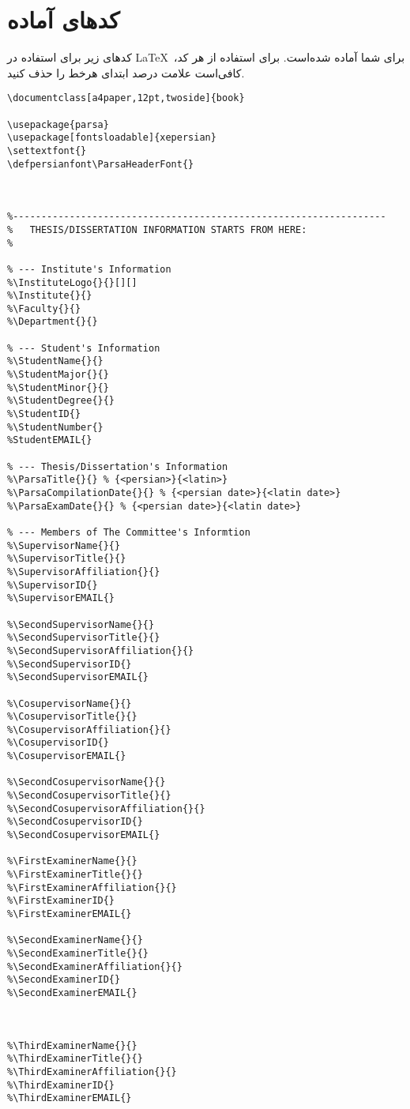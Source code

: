 \documentclass[12pt,a4paper,twoside,fleqn,notitlepage,openany]{extarticle}
\begin{document}
\section{کدهای آماده}
کدهای زیر برای استفاده در \LaTeX ~برای شما آماده شده‌است. برای استفاده از هر کد، کافی‌است علامت درصد ابتدای هرخط را حذف کنید.
\begin{latin}
\begin{verbatim}
\documentclass[a4paper,12pt,twoside]{book}

\usepackage{parsa}
\usepackage[fontsloadable]{xepersian}
\settextfont{} 
\defpersianfont\ParsaHeaderFont{} 



%------------------------------------------------------------------
%	THESIS/DISSERTATION INFORMATION STARTS FROM HERE:
%

% --- Institute's Information
%\InstituteLogo{}{}[][] 
%\Institute{}{}
%\Faculty{}{}
%\Department{}{} 

% --- Student's Information
%\StudentName{}{} 
%\StudentMajor{}{}
%\StudentMinor{}{}
%\StudentDegree{}{}
%\StudentID{}
%\StudentNumber{}
%StudentEMAIL{}

% --- Thesis/Dissertation's Information
%\ParsaTitle{}{} % {<persian>}{<latin>}
%\ParsaCompilationDate{}{} % {<persian date>}{<latin date>}
%\ParsaExamDate{}{} % {<persian date>}{<latin date>}

% --- Members of The Committee's Informtion
%\SupervisorName{}{} 
%\SupervisorTitle{}{}
%\SupervisorAffiliation{}{}
%\SupervisorID{}
%\SupervisorEMAIL{}

%\SecondSupervisorName{}{}
%\SecondSupervisorTitle{}{}
%\SecondSupervisorAffiliation{}{}
%\SecondSupervisorID{}
%\SecondSupervisorEMAIL{}

%\CosupervisorName{}{}
%\CosupervisorTitle{}{}
%\CosupervisorAffiliation{}{}
%\CosupervisorID{}
%\CosupervisorEMAIL{}

%\SecondCosupervisorName{}{}
%\SecondCosupervisorTitle{}{}
%\SecondCosupervisorAffiliation{}{}
%\SecondCosupervisorID{}
%\SecondCosupervisorEMAIL{}

%\FirstExaminerName{}{}
%\FirstExaminerTitle{}{}
%\FirstExaminerAffiliation{}{}
%\FirstExaminerID{}
%\FirstExaminerEMAIL{}

%\SecondExaminerName{}{}
%\SecondExaminerTitle{}{}
%\SecondExaminerAffiliation{}{}
%\SecondExaminerID{}
%\SecondExaminerEMAIL{}



%\ThirdExaminerName{}{}
%\ThirdExaminerTitle{}{}
%\ThirdExaminerAffiliation{}{}
%\ThirdExaminerID{}
%\ThirdExaminerEMAIL{}


\end{verbatim}
\end{latin}
\end{document}
